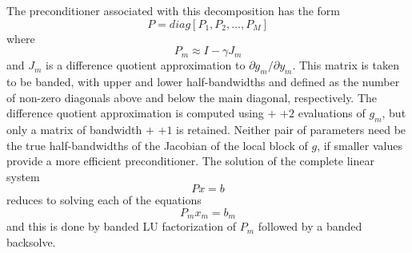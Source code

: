 The preconditioner associated with this decomposition has the form 
\begin{equation}
  P= diag[P_1, P_2, \ldots, P_M]
\end{equation}
where 
\begin{equation}
  P_m \approx I - \gamma J_m
\end{equation}
and $J_m$ is a difference quotient approximation to 
$\partial g_m/\partial y_m$. This matrix is taken to be banded, with
upper and lower half-bandwidths  and  defined as
the number of non-zero diagonals above and below the main diagonal,
respectively. The difference quotient approximation is computed using
 $+$  $+ 2$ evaluations of $g_m$, but only a matrix
of bandwidth  $+$  $+ 1$ is retained. 
Neither pair of parameters need be the true half-bandwidths of the Jacobian of the
local block of $g$, if smaller values provide a more efficient
preconditioner. The solution of the complete linear system
\begin{equation}
  Px = b
\end{equation}
reduces to solving each of the equations 
\begin{equation}
  P_m x_m = b_m
\end{equation}
and this is done by banded LU factorization of $P_m$ followed by a banded
backsolve.



